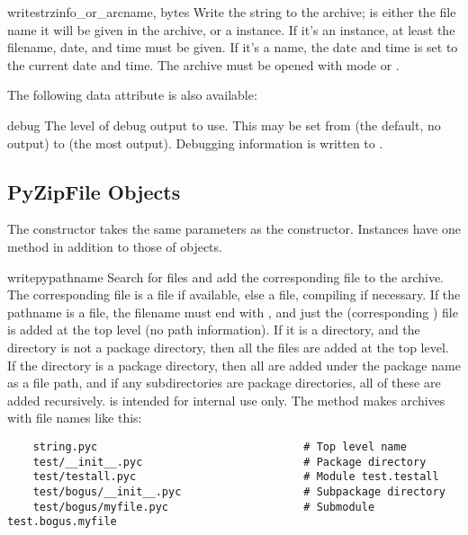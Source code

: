 \begin{methoddesc}{writestr}{zinfo_or_arcname, bytes}
  Write the string  to the archive; 
  is either the file name it will be given in the archive, or a
   instance.  If it's an instance, at least the
  filename, date, and time must be given.  If it's a name, the date
  and time is set to the current date and time. The archive must be
  opened with mode  or .
\end{methoddesc}


The following data attribute is also available:

\begin{memberdesc}{debug}
  The level of debug output to use.  This may be set from 
  (the default, no output) to  (the most output).  Debugging
  information is written to .
\end{memberdesc}


\subsection{PyZipFile Objects \label{pyzipfile-objects}}

The  constructor takes the same parameters as the
 constructor.  Instances have one method in addition to
those of  objects.

\begin{methoddesc}[PyZipFile]{writepy}{pathname}
  Search for files  and add the corresponding file to the
  archive.  The corresponding file is a  file if
  available, else a  file, compiling if necessary.  If the
  pathname is a file, the filename must end with , and just
  the (corresponding ) file is added at the top level
  (no path information).  If it is a directory, and the directory is
  not a package directory, then all the files  are
  added at the top level.  If the directory is a package directory,
  then all  are added under the package name as a file
  path, and if any subdirectories are package directories, all of
  these are added recursively.   is intended for
  internal use only.  The  method makes archives
  with file names like this:

\begin{verbatim}
    string.pyc                                # Top level name 
    test/__init__.pyc                         # Package directory 
    test/testall.pyc                          # Module test.testall
    test/bogus/__init__.pyc                   # Subpackage directory 
    test/bogus/myfile.pyc                     # Submodule test.bogus.myfile
\end{verbatim}
\end{methoddesc}


